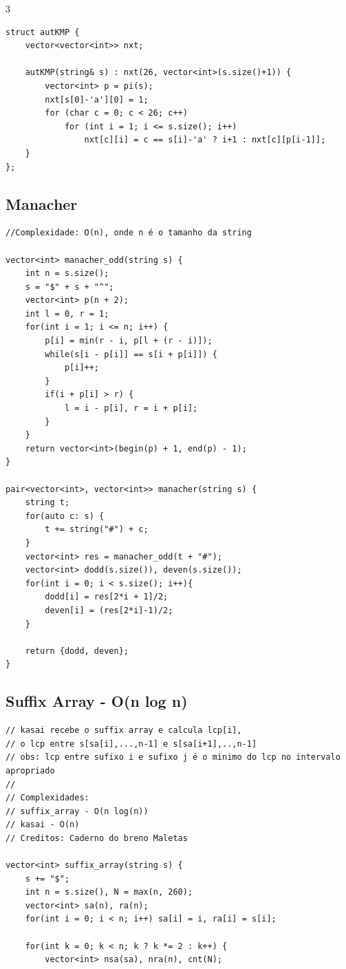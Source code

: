 \documentclass[9pt, a4paper, notitlepage]{extreport}
\begin{document}
\begin{multicols}{3}
\begin{verbatim}
struct autKMP {
    vector<vector<int>> nxt;

    autKMP(string& s) : nxt(26, vector<int>(s.size()+1)) {
        vector<int> p = pi(s);
        nxt[s[0]-'a'][0] = 1;
        for (char c = 0; c < 26; c++)
            for (int i = 1; i <= s.size(); i++)
                nxt[c][i] = c == s[i]-'a' ? i+1 : nxt[c][p[i-1]];
    }
};
\end{verbatim}

\subsection{Manacher}
\begin{verbatim}
//Complexidade: O(n), onde n é o tamanho da string

vector<int> manacher_odd(string s) {
    int n = s.size();
    s = "$" + s + "^";
    vector<int> p(n + 2);
    int l = 0, r = 1;
    for(int i = 1; i <= n; i++) {
        p[i] = min(r - i, p[l + (r - i)]);
        while(s[i - p[i]] == s[i + p[i]]) {
            p[i]++;
        }
        if(i + p[i] > r) {
            l = i - p[i], r = i + p[i];
        }
    }
    return vector<int>(begin(p) + 1, end(p) - 1);
}

pair<vector<int>, vector<int>> manacher(string s) {
    string t;
    for(auto c: s) {
        t += string("#") + c;
    }
    vector<int> res = manacher_odd(t + "#");
    vector<int> dodd(s.size()), deven(s.size());
    for(int i = 0; i < s.size(); i++){
        dodd[i] = res[2*i + 1]/2;
        deven[i] = (res[2*i]-1)/2;
    }

    return {dodd, deven};
}
\end{verbatim}

\subsection{Suffix Array - O(n log n)}
\begin{verbatim}
// kasai recebe o suffix array e calcula lcp[i],
// o lcp entre s[sa[i],...,n-1] e s[sa[i+1],..,n-1]
// obs: lcp entre sufixo i e sufixo j é o minimo do lcp no intervalo apropriado
//
// Complexidades:
// suffix_array - O(n log(n))
// kasai - O(n)
// Creditos: Caderno do breno Maletas

vector<int> suffix_array(string s) {
	s += "$";
	int n = s.size(), N = max(n, 260);
	vector<int> sa(n), ra(n);
	for(int i = 0; i < n; i++) sa[i] = i, ra[i] = s[i];

	for(int k = 0; k < n; k ? k *= 2 : k++) {
		vector<int> nsa(sa), nra(n), cnt(N);


\end{verbatim}
\end{multicols}
\end{document}
